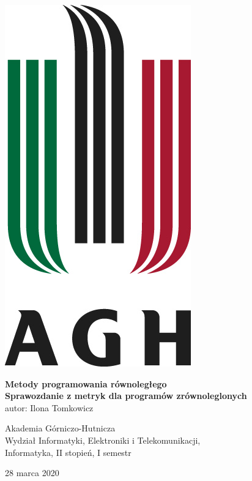 \documentclass[10pt,english, openany]{book}
\begin{document}

\begin{titlepage}
	\clearpage\thispagestyle{empty}
	\centering
	\vspace{0.5cm}    
    \centering \includegraphics[scale=0.5]{agh.jpg}    
	\vspace{0.5cm}   
	
		\vspace{2cm}
	{\huge \textbf{Metody programowania równoległego}} \\
	\vspace{0.5cm} 
	{\Huge \textbf{Sprawozdanie z metryk dla programów zrównoleglonych}} \\
	\vspace{6cm}	
	{\Large autor: Ilona Tomkowicz\\}
	\vspace{0.5cm} 
	{\Large Akademia Górniczo-Hutnicza\\
	Wydział Informatyki, Elektroniki i Telekomunikacji,\\
	Informatyka, II stopień, I semestr \par}
	   \vspace{0.5cm} 
	{\Large 28 marca 2020 \par}
	
	\pagebreak

\end{titlepage}
\end{document}
